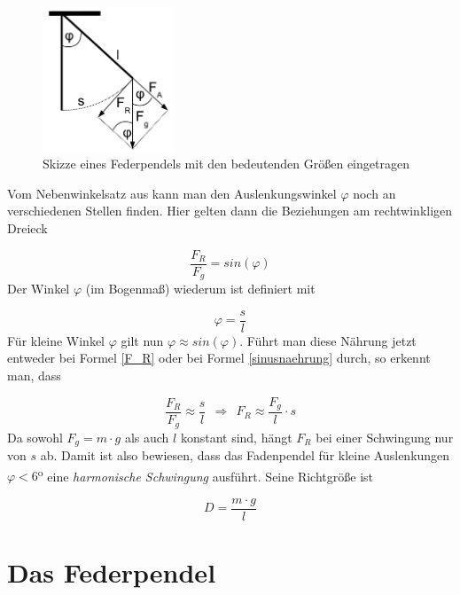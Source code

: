 	\begin{figure}[h]
		\centering
		\includegraphics[width=0.35\textwidth]{mat/federpendel}
		\caption{Skizze eines Federpendels mit den bedeutenden Größen eingetragen}
			\label{skizze_federpendel}
	\end{figure}
Vom Nebenwinkelsatz aus kann man den Auslenkungswinkel \(\varphi\) noch an verschiedenen Stellen finden. Hier gelten dann die Beziehungen am rechtwinkligen Dreieck

	\begin{equation}
		\frac{F_R}{F_g} = sin(\varphi) 
			\label{F_R}
	\end{equation}
Der Winkel \(\varphi\) (im Bogenmaß) wiederum ist definiert mit 

	\begin{equation}
		\varphi = \frac{s}{l}
			\label{sinusnaehrung}
	\end{equation}
Für kleine Winkel \(\varphi\) gilt nun \(\varphi \approx sin(\varphi)\). Führt man diese Nährung jetzt entweder bei Formel \ref{F_R} oder bei Formel \ref{sinusnaehrung} durch, so erkennt man, dass

	\begin{equation}
		\frac{F_R}{F_g} \approx \frac{s}{l} ~~ \Rightarrow ~~ F_R \approx \frac{F_g}{l} \cdot s
			\label{naehrungsgleichung}
	\end{equation}
Da sowohl \(F_g = m \cdot g\) als auch \(l\) konstant sind, hängt \(F_R\) bei einer Schwingung nur von \(s\) ab. Damit ist also bewiesen, dass das Fadenpendel für kleine Auslenkungen \(\varphi < 6\)\textsuperscript{o} eine \emph{harmonische Schwingung} ausführt. Seine Richtgröße ist 

	\begin{equation}
		D = \frac{m \cdot g}{l}
			\label{richtgroesse_fadenpendel}
	\end{equation}
		
		
		
		\section{Das Federpendel}
	

